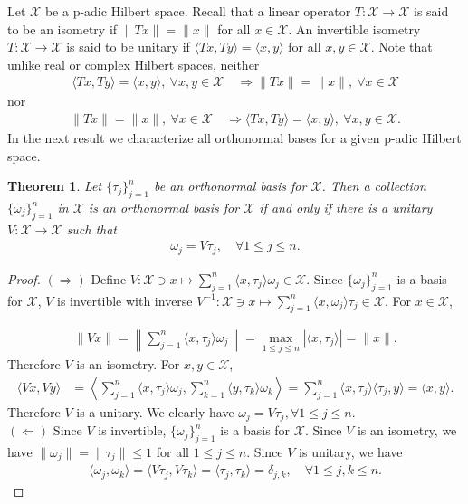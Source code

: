 \documentclass{amsart}
\newtheorem{theorem}{Theorem}[section]
\begin{document}
Let $\mathcal{X}$ be a p-adic Hilbert space. Recall that a linear operator $T:\mathcal{X} \to \mathcal{X}$ is said to be an isometry if $\|Tx\|=\|x\|$ for all $x \in \mathcal{X}$. An invertible isometry $T:\mathcal{X} \to \mathcal{X}$ is said to be unitary if $\langle Tx, Ty\rangle =\langle x, y \rangle $ for all $x, y \in \mathcal{X}$. Note that unlike real or complex Hilbert spaces, neither 
\begin{align*}
\langle Tx, Ty\rangle =\langle x, y \rangle, ~ \forall x, y \in \mathcal{X}	\quad \Rightarrow \|Tx\|=\|x\|, ~ \forall x  \in \mathcal{X}
\end{align*}
nor 
\begin{align*}
\|Tx\|=\|x\|, ~ \forall x  \in \mathcal{X}	\quad \Rightarrow \langle Tx, Ty\rangle =\langle x, y \rangle, ~ \forall x, y \in \mathcal{X}.
\end{align*}
In the next result we characterize all orthonormal bases for a given p-adic Hilbert space.
\begin{theorem}
	Let $\{\tau_j\}_{j=1}^n$ be an orthonormal basis for $\mathcal{X}$. Then a collection 	$\{\omega_j\}_{j=1}^n$ in $\mathcal{X}$ is an orthonormal basis for $\mathcal{X}$ if and only if there is a unitary $V:\mathcal{X} \to \mathcal{X}$ such that 
	\begin{align*}
		 \omega_j=V\tau_j, \quad \forall 1\leq j \leq n.
	\end{align*}
\end{theorem}
\begin{proof}
	$(\Rightarrow)$ Define $V:\mathcal{X}\ni x \mapsto \sum_{j=1}^{n}\langle x, \tau_j \rangle \omega_j \in \mathcal{X}$. Since $\{\omega_j\}_{j=1}^n$ is a basis for $\mathcal{X}$, $V$ is invertible with inverse $V^{-1}:\mathcal{X}\ni x \mapsto \sum_{j=1}^{n}\langle x, \omega_j \rangle\tau_j \in \mathcal{X}$. For $x \in \mathcal{X}$, 
	
	\begin{align*}
		\|Vx\|=\left\| \sum_{j=1}^{n}\langle x, \tau_j \rangle\omega_j \right\|=\displaystyle \max_{1\leq j\leq n}|\langle x, \tau_j\rangle|=\|x\|.
	\end{align*}
	Therefore $V$ is an isometry. For $x, y \in \mathcal{X}$, 
	\begin{align*}
		\langle Vx, Vy\rangle &=\left \langle \sum_{j=1}^{n}\langle x, \tau_j \rangle\omega_j, \sum_{k=1}^{n}\langle y, \tau_k \rangle\omega_k\right \rangle=\sum_{j=1}^{n}\langle x, \tau_j \rangle \langle \tau_j, y \rangle =\langle x, y \rangle.
	\end{align*}
Therefore $V$ is a unitary. We clearly have $\omega_j=V\tau_j,  \forall 1\leq j \leq n.$ \\
	$(\Leftarrow)$ Since $V$ is invertible, $\{\omega_j\}_{j=1}^n$ is a basis for $\mathcal{X}$.   Since $V$ is an isometry, we have $\|\omega_j\|=\|\tau_j\|\leq 1$ for all $1\leq j \leq n$. Since $V$ is unitary,  we have 
	\begin{align*}
			\langle \omega_j, \omega_k\rangle=\langle V\tau_j, V\tau_k\rangle=\langle \tau_j, \tau_k\rangle =\delta_{j,k}, \quad \forall 1\leq j,k \leq n.
	\end{align*}
\end{proof}
\end{document}
